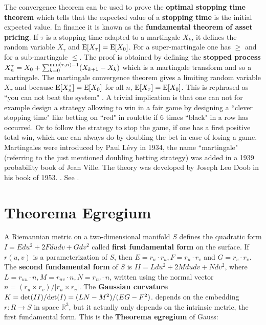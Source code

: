 \documentclass[12pt]{amsart}
\newcounter{example}    \def\example#1{ \item \fontsize{12}{15} \selectfont #1 \fontsize{12}{15} \selectfont }
\begin{document}
The convergence theorem can be used to prove the {\bf optimal stopping time theorem} which tells that the expected value
of a {\bf stopping time} is the initial expected value. In finance it is known as the {\bf fundamental theorem of 
asset pricing}. If $\tau$ is a stopping time adapted to a martingale $X_k$, it defines the random variable $X_{\tau}$
and ${\rm E}[X_\tau]={\rm E}[X_0]$. For a super-martingale one has $\geq$ and for a sub-martingale $\leq$. 
The proof is obtained by defining the {\bf stopped process} 
$X^{\tau}_n = X_0 + \sum_{k=0}^{{\rm min}(\tau,n)-1} (X_{k+1}-X_k)$ which is a martingale transform and so a martingale.
The martingale convergence theorem gives a limiting random variable $X_{\tau}$ and because ${\rm E}[X_n^{\tau}]={\rm E}[X_0]$
for all $n$,  ${\rm E}[X_\tau]={\rm E}[X_0]$. This is rephrased as ``you can not beat the system" \cite{WilliamsMartingales}.
A trivial implication is that one can not for example design a strategy allowing to win in a fair game by designing a ``clever
stopping time" like betting on ``red" in roulette if 6 times ``black" in a row has occurred. Or to follow the strategy
to stop the game, if one has a first positive total win, which one can always do by doubling the bet in case of 
losing a game. Martingales were introduced by Paul L\'evy in 1934, the name ``martingale" (referring to the just mentioned 
doubling betting strategy) was added in a 1939 probability book of Jean Ville. 
The theory was developed by Joseph Leo Doob in his book of 1953. 
\cite{DoobStochastic}. See \cite{WilliamsMartingales}. 


\section{Theorema Egregium}

A Riemannian metric on a two-dimensional manifold $S$ defines the
quadratic form $I = E du^2+2Fdudv+G dv^2$ called {\bf first fundamental form}
on the surface. If $r(u,v)$ is a parameterization of $S$, then
$E=r_u \cdot r_u, F=r_u \cdot r_v$ and $G=r_v \cdot r_v$.
The {\bf second fundamental form} of $S$ is 
$II=L du^2 + 2 M du dv + N dv^2$,
where $L=r_{uu} \cdot n, M = r_{uv} \cdot n, N = r_{vv} \cdot n$, 
written using the normal vector $n=(r_u \times r_v)/|r_u \times r_v|$. 
The {\bf Gaussian curvature}
$K={\rm det}(II)/{\rm det}(I) = (LN-M^2)/(EG-F^2)$. 
depends on the embedding $r: R \to S$ in space $\mathbb{R}^3$, but
it actually only depends on the intrinsic metric, 
the first fundamental form. This is the {\bf Theorema egregium} of Gauss:
\end{document}

